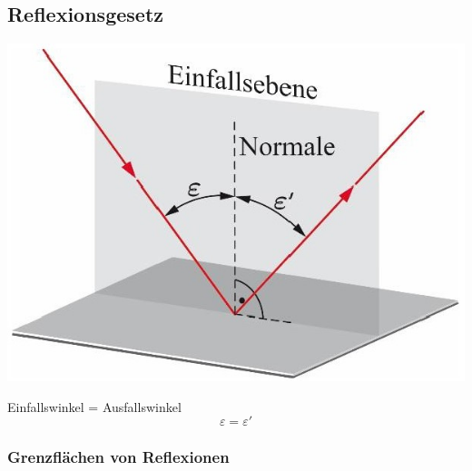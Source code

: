 








\subsection{Reflexionsgesetz}

\begin{minipage}{0.44\linewidth}
\includegraphics[width=\linewidth]{Bilder/Wellen-Optik/reflexionsgesetz}
\end{minipage}
\hfill
\begin{minipage}{0.48\linewidth}
Einfallswinkel = Ausfallswinkel \\

$$ \boxed{ \varepsilon = \varepsilon' } $$
\end{minipage}



\subsubsection{Grenzflächen von Reflexionen}

